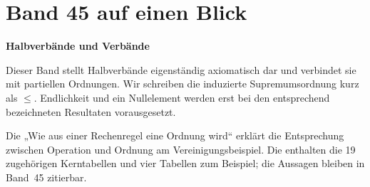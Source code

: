 \chapter[Band 45: Halbverbände und Verbände]{Band 45 auf einen Blick}
\noindent\textbf{Halbverbände und Verbände}\par\medskip
Dieser Band stellt Halbverbände eigenständig axiomatisch dar und
verbindet sie mit partiellen Ordnungen. Wir schreiben die induzierte
Supremumsordnung kurz als \(\le\). Endlichkeit und ein Nullelement
werden erst bei den entsprechend bezeichneten Resultaten vorausgesetzt.

Die \SemilatticeReadingLink{} „Wie aus einer Rechenregel eine Ordnung wird“
erklärt die Entsprechung zwischen Operation und Ordnung am Vereinigungsbeispiel.
Die \SemilatticeProofsLink{} enthalten die 19 zugehörigen Kerntabellen und
vier Tabellen zum Beispiel; die Aussagen bleiben in Band~45 zitierbar.

